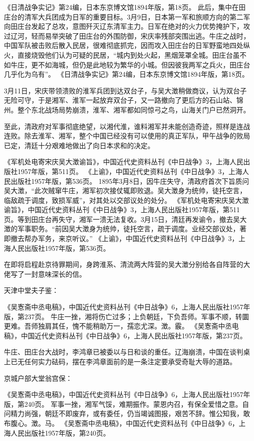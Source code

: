 \documentclass[12pt,UTF8]{ctexbook}
\begin{document}
《日清战争实记》第24编，日本东京博文馆1894年版，第18页。
此后，集中在田庄台的清军大兵团成为日军的重要目标。3月9日，日本第一军和旅顺方向的第二军向田庄台发起了总攻，意图歼灭辽东清军主力。日军在绝对的火力优势掩护下，攻过辽河，轻而易举突破了田庄台的外围防御，宋庆率残部突围出逃。牛庄之战时，中国军队被击败后散入民居，很难彻底抓完，因而攻入田庄台的日军野蛮地四处纵火，直接烧毁他们认为可疑的民居，“城内到处火起，黑烟笼罩全城。田庄台虽不如牛庄，更不如海城，但仍是此地较为繁华的小城。但因彼我两军之兵火，田庄台几乎化为乌有”。 《日清战争实记》第24编，日本东京博文馆1894年版，第18页。

3月11日，宋庆带领溃败的淮军兵团到达双台子，与吴大澂稍做商议，认为双台子无险可守，于是湘军、淮军一起放弃双台子，又一路撤向了更后方的石山站、锦州。整个东北战场局势崩溃，淮军、湘军都如同惊弓之鸟，山海关门户已然洞开。

至此，清政府对军事彻底绝望，以湘代淮，谁料湘军并未能创造奇迹，照样是连战连败。除去淮军、湘军，整个中国已经没有可以使用的真正军队，甲午战争的败局已定，清廷十分艰难地做出了向日本求和的决定。

《军机处电寄宋庆吴大澂谕旨》，中国近代史资料丛刊《中日战争》3，上海人民出版社1957年版，第511页。
《上谕》，中国近代史资料丛刊《中日战争》3，上海人民出版社1957年版，第536页。
1895年3月8日，因牛庄失守，清政府首次下旨质问吴大澂，“此次贼窜牛庄，湘军初次接仗辄即败退。吴大澂身为统帅，徒托空言，临敌疏于调度，致损军威”，对其处以交部议处的处分。 《军机处电寄宋庆吴大澂谕旨》，中国近代史资料丛刊《中日战争》3，上海人民出版社1957年版，第511页。等到田庄台再失守，湘军一溃无法复收。3月15日，清廷再发谕令，撤去吴大澂的军事职务。“前因吴大澂身为统帅，徒托空言，疏于调度。业经交部议处，著即撤去帮办军务，来京听议。” 《上谕》，中国近代史资料丛刊《中日战争》3，上海人民出版社1957年版，第536页。

在即将启程赴京待罪期间，身跨淮系、清流两大阵营的吴大澂分别给各自阵营的大佬写了一封意味深长的信。

天津中堂夫子鉴：

《吴愙斋中丞电稿》，中国近代史资料丛刊《中日战争》6，上海人民出版社1957年版，第237页。
牛庄一挫，湘将伤亡过多；上负朝廷，下负吾师。军事不顺，转圜更难。吾师独肩其任，愧不能稍助万一，孺恋尤深。澂。霰。 《吴愙斋中丞电稿》，中国近代史资料丛刊《中日战争》6，上海人民出版社1957年版，第237页。

牛庄、田庄台大战时，李鸿章已被委以与日和谈的重任。辽海崩溃，中国在谈判桌上已无任何实力砝码，摆在李鸿章面前的是一条注定要承受奇耻大辱的道路。

京城户部大堂翁宫保：

《吴愙斋中丞电稿》，中国近代史资料丛刊《中日战争》6，上海人民出版社1957年版，第240页。
军事一挫，湘军气馁，难期振作。蒙恩内召，有保全爱惜之意。自问精力尚强，朝廷不即废弃，或有委任，仍当竭诚图报，艰苦不辞。惟公知我，敢布腹心。澂。马。 《吴愙斋中丞电稿》，中国近代史资料丛刊《中日战争》6，上海人民出版社1957年版，第240页。
\end{document}
